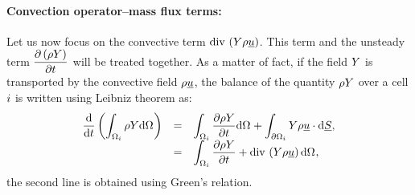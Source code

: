 \paragraph{Convection operator--mass flux terms:}
 Let us now focus on the convective term $\text{div}\, \left( Y \rho \underline{u}\right)$. This term and the
 unsteady term $ \dfrac{\partial  \left( \rho Y \right) }{\partial  t} $ will be treated
 together. As a matter of fact, if the field $Y$ is transported by the convective field $\rho \underline{u}$, the balance
 of the quantity $\rho Y$ over a cell $i$ is written using Leibniz theorem as:
 \begin{equation}\label{eq:spadis:leibnitz_th}
\begin{array}{r c l}
\displaystyle \dfrac{\mathrm{d} }{\mathrm{d} t} \left( \int_{\Omega_{i}} \rho Y \mathrm{d} \Omega_{}\right) &=&
\displaystyle \int_{\Omega_{i}} \dfrac{\partial \rho Y}{\partial t} \mathrm{d} \Omega_{} + \int_{\partial \Omega_{i}} Y \rho \underline{u} \cdot  \mathrm{d} \underline{S}, \\
\displaystyle &=&
\displaystyle \int_{\Omega_{i}} \dfrac{\partial \rho Y}{\partial t} + \text{div}\, \left( Y \rho \underline{u} \right)  \mathrm{d} \Omega_{},
\end{array}
 \end{equation}
the second line is obtained using Green's relation.

